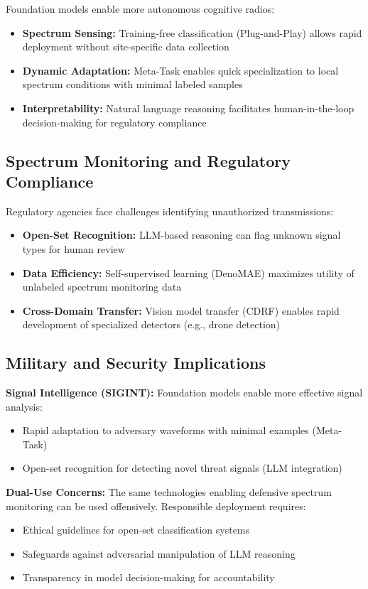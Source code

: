 Foundation models enable more autonomous cognitive radios:
\begin{itemize}
    \item \textbf{Spectrum Sensing:} Training-free classification (Plug-and-Play) allows rapid deployment without site-specific data collection
    \item \textbf{Dynamic Adaptation:} Meta-Task enables quick specialization to local spectrum conditions with minimal labeled samples
    \item \textbf{Interpretability:} Natural language reasoning facilitates human-in-the-loop decision-making for regulatory compliance
\end{itemize}

\subsection{Spectrum Monitoring and Regulatory Compliance}

Regulatory agencies face challenges identifying unauthorized transmissions:
\begin{itemize}
    \item \textbf{Open-Set Recognition:} LLM-based reasoning can flag unknown signal types for human review
    \item \textbf{Data Efficiency:} Self-supervised learning (DenoMAE) maximizes utility of unlabeled spectrum monitoring data
    \item \textbf{Cross-Domain Transfer:} Vision model transfer (CDRF) enables rapid development of specialized detectors (e.g., drone detection)
\end{itemize}

\subsection{Military and Security Implications}

\textbf{Signal Intelligence (SIGINT):} Foundation models enable more effective signal analysis:
\begin{itemize}
    \item Rapid adaptation to adversary waveforms with minimal examples (Meta-Task)
    \item Open-set recognition for detecting novel threat signals (LLM integration)
\end{itemize}

\textbf{Dual-Use Concerns:} The same technologies enabling defensive spectrum monitoring can be used offensively. Responsible deployment requires:
\begin{itemize}
    \item Ethical guidelines for open-set classification systems
    \item Safeguards against adversarial manipulation of LLM reasoning
    \item Transparency in model decision-making for accountability
\end{itemize}

